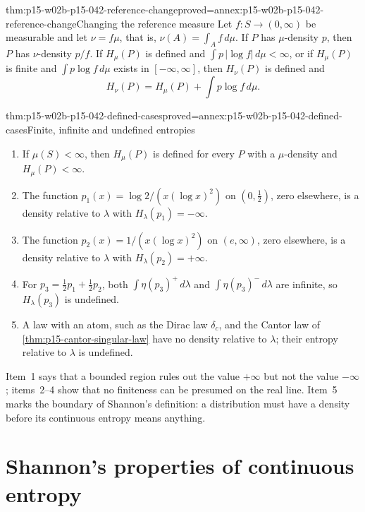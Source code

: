 \begin{hbtheorem}{thm:p15-w02b-p15-042-reference-change}{proved=annex:p15-w02b-p15-042-reference-change}{Changing the reference measure}
Let \(f:S\to(0,\infty)\) be measurable and let \(\nu=f\mu\), that is,
\(\nu(A)=\int_A f\,d\mu\). If \(P\) has \(\mu\)-density \(p\), then \(P\) has
\(\nu\)-density \(p/f\). If \(H_\mu(P)\) is defined and
\(\int p\,|\log f|\,d\mu<\infty\), or if \(H_\mu(P)\) is finite and
\(\int p\log f\,d\mu\) exists in \([-\infty,\infty]\), then \(H_\nu(P)\) is
defined and
\[
 H_\nu(P)=H_\mu(P)+\int p\log f\,d\mu .
\]
\end{hbtheorem}

\begin{hbtheorem}{thm:p15-w02b-p15-042-defined-cases}{proved=annex:p15-w02b-p15-042-defined-cases}{Finite, infinite and undefined entropies}
\begin{enumerate}
\item If \(\mu(S)<\infty\), then \(H_\mu(P)\) is defined for every \(P\)
      with a \(\mu\)-density and \(H_\mu(P)<\infty\).
\item The function \(p_1(x)=\log2/(x(\log x)^2)\) on \((0,\tfrac12)\), zero
      elsewhere, is a density relative to \(\lambda\) with
      \(H_\lambda(p_1)=-\infty\).
\item The function \(p_2(x)=1/(x(\log x)^2)\) on \((e,\infty)\), zero
      elsewhere, is a density relative to \(\lambda\) with
      \(H_\lambda(p_2)=+\infty\).
\item For \(p_3=\tfrac12p_1+\tfrac12p_2\), both \(\int\eta(p_3)^+\,d\lambda\)
      and \(\int\eta(p_3)^-\,d\lambda\) are infinite, so
      \(H_\lambda(p_3)\) is undefined.
\item A law with an atom, such as the Dirac law \(\delta_c\), and the
      Cantor law of \cref{thm:p15-cantor-singular-law} have no density
      relative to \(\lambda\); their entropy relative to \(\lambda\) is
      undefined.
\end{enumerate}
\end{hbtheorem}

Item~1 says that a bounded region rules out the value \(+\infty\) but not the
value \(-\infty\); items~2--4 show that no finiteness can be presumed on the
real line. Item~5 marks the boundary of Shannon's definition: a distribution
must have a density before its continuous entropy means anything.

\section{Shannon's properties of continuous entropy}
\label{sec:p15-w02b-p15-042-properties}

